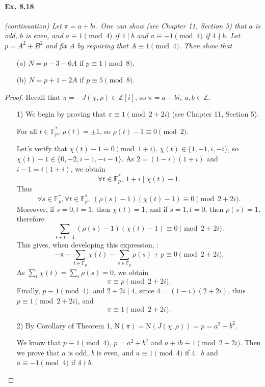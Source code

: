 \documentclass[11pt,a4paper]{article}
\newcommand{\Z}{\mathbb{Z}}
\newcommand{\F}{\mathbb{F}}
\begin{document}
{\paragraph{Ex. 8.18}

{\it (continuation) Let $\pi = a+bi$. One can show (see Chapter 11, Section 5) that $a$ is odd, $b$ is even, and $a\equiv 1 \pmod 4$ if $4\mid b$ and $a\equiv -1 \pmod 4$ if $4\nmid b$. Let $p=A^2+B^2$ and fix $A$ by requiring that $A\equiv 1 \pmod 4$. Then show that
\begin{enumerate}
\item[(a)] $N = p-3 -6A$ if $p\equiv 1 \pmod 8$,
\item[(b)] $N = p+1 + 2A$ if $p \equiv 5 \pmod 8$.
\end{enumerate}
}

\begin{proof}
Recall that $\pi = -J(\chi,\rho) \in \Z[i]$, so $\pi = a + bi,\ a,b \in \Z$.
\begin{enumerate}
\item[1)] We begin by proving that $\pi \equiv 1 \pmod {2+2i}$ (see Chapter 11, Section 5).

For all $ t \in \F_p^*$, $\rho(t) = \pm 1$, so $\rho(t) - 1 \equiv 0 \pmod 2$.

Let's verify that $\chi(t) - 1 \equiv 0 \pmod{1+i}$. $\chi(t) \in \{1,-1,i,-i\}$, so  $\chi(t) - 1 \in \{0,-2, i - 1, - i-1\}$. As $2 = (1-i)(1+i)$ and $i-1 = i(1+i)$, we obtain
$$\forall t \in \F_p^*, \ 1+i \mid \chi(t) - 1.$$
Thus
$$\forall s \in \F_p^*, \forall t \in \F_p^*, \ (\rho(s)-1)(\chi(t) - 1) \equiv 0 \pmod {2+2i}.$$
Moreover, if $s = 0, t= 1$, then $\chi(t) = 1$, and if $s=1,t=0$, then $\rho(s) = 1$, therefore
$$\sum_{s+t=1} (\rho(s)-1)(\chi(t)-1) \equiv 0 \pmod {2+2i}.$$
This gives, when developing this expression, :
$$-\pi - \sum_{t \in \F_p} \chi(t) - \sum_{s\in \F_p} \rho(s) + p \equiv 0 \pmod {2+2i}.$$
As $\sum_t \chi(t) = \sum_s \rho(s) = 0$, we obtain
$$\pi \equiv p \pmod {2+2i}.$$
Finally, $p \equiv 1 \pmod 4$, and $2+2i \mid 4$, since $4 = (1-i)(2+2i)$, thus $p \equiv 1 \pmod {2+2i}$, and
$$\pi \equiv 1 \pmod {2+2i}.$$

\item[2)] By Corollary of Theorem 1, $\mathrm{N}(\pi) = \mathrm{N}(J(\chi,\rho)) = p = a^2+b^2$.

We know that $p\equiv 1 \pmod 4$, $p = a^2 + b^2$ and $a+ib \equiv 1 \pmod {2+2i}$. Then  we prove that $a$ is odd, $b$ is even, and $a\equiv 1 \pmod 4$ if $4\mid b$ and $a\equiv -1 \pmod 4$ if $4\nmid b$. 


\end{enumerate}
\end{proof}}
\end{document}
